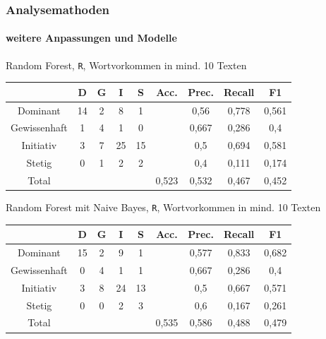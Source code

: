 \documentclass{beamer}
\begin{document}
\begin{frame}
 \frametitle{Analysemathoden}
 \framesubtitle{weitere Anpassungen und Modelle}
 
 Random Forest, \texttt{R}, Wortvorkommen in mind. 10 Texten
 \begin{center}
 \begin{tabular}{c|c|c|c|c|c|c|c|c|}
                & D     & G  & I    & S   & Acc.  & Prec. & Recall    & F1 \\
  \hline
  Dominant      & 14    & 2  & 8    & 1   &       & 0,56  & 0,778     & 0,561 \\
  Gewissenhaft  & 1     & 4  & 1    & 0   &       & 0,667 & 0,286     & 0,4 \\
  Initiativ     & 3     & 7  & 25   & 15  &       & 0,5   & 0,694     & 0,581\\
  Stetig        & 0     & 1  & 2    & 2   &       & 0,4   & 0,111     & 0,174\\
  \hline
  Total         &       &    &      &     & 0,523 & 0,532 & 0,467     & 0,452\\
  \hline
 \end{tabular}
 \end{center}
 
 \vspace{12pt}
 Random Forest mit Naive Bayes, \texttt{R}, Wortvorkommen in mind. 10 Texten
 \begin{center}
  \begin{tabular}{c|c|c|c|c|c|c|c|c|}
                & D     & G  & I    & S   & Acc.  & Prec. & Recall    & F1 \\
  \hline
  Dominant      & 15    & 2  & 9    & 1   &       & 0,577 & 0,833     & 0,682 \\
  Gewissenhaft  & 0     & 4  & 1    & 1   &       & 0,667 & 0,286     & 0,4 \\
  Initiativ     & 3     & 8  & 24   & 13  &       & 0,5   & 0,667     & 0,571\\
  Stetig        & 0     & 0  & 2    & 3   &       & 0,6   & 0,167     & 0,261\\
  \hline
  Total         &       &    &      &     & 0,535 & 0,586 & 0,488     & 0,479\\
  \hline
 \end{tabular}
 \end{center}
 
\end{frame}

\end{document}
